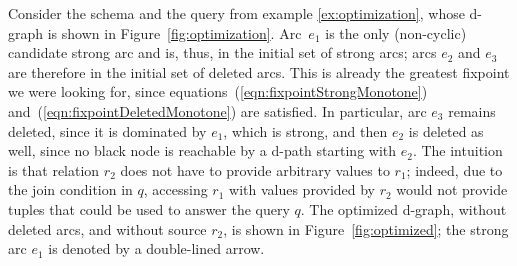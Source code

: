 \begin{example}\label{ex:optimization-cont}
  Consider the schema and the query from example \ref{ex:optimization},
  whose d-graph is shown in Figure~\ref{fig:optimization}.
  Arc~$e_1$ is the only (non-cyclic) candidate strong arc and is, thus, in
  the initial set of strong arcs; arcs $e_2$ and $e_{3}$ are therefore in the
  initial set of deleted arcs.  This is already the greatest fixpoint we were
  looking for, since equations~(\ref{eqn:fixpointStrongMonotone})
  and~(\ref{eqn:fixpointDeletedMonotone}) are satisfied. In particular, arc
  $e_{3}$ remains deleted, since it is dominated by $e_{1}$, which is strong,
  and then $e_2$ is deleted as well, since no black node is reachable by a
  d-path starting with $e_{2}$.
  The intuition is that relation $r_2$ does not have to provide arbitrary values to $r_1$; indeed, due to the join condition
  in $q$, accessing $r_1$ with values provided by $r_2$ would not provide
  tuples that could be used to answer the query $q$.  The optimized d-graph,
  without deleted arcs, and without source $r_2$, is shown in
  Figure~\ref{fig:optimized}; the strong arc $e_1$ is denoted by a double-lined arrow.
\end{example}
























